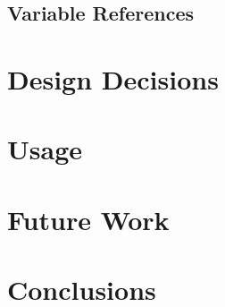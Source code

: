 \subsection{Variable References}



\section{Design Decisions}



\section{Usage}

\section{Future Work}

\section{Conclusions}

